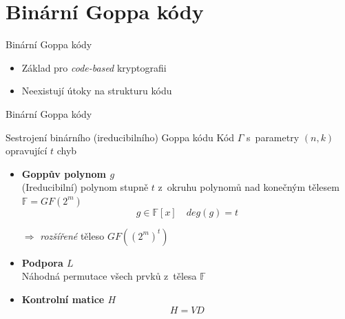 \documentclass{beamer}
\begin{document}
\section{Binární Goppa kódy}

\begin{frame}{Binární Goppa kódy}
    \begin{itemize}

            \pause

        \item Základ pro \emph{code-based} kryptografii

            \pause
        \item Neexistují útoky na strukturu kódu

    \end{itemize}
\end{frame}

\begin{frame}{Binární Goppa kódy}

    \begin{block}{Sestrojení binárního (ireducibilního) Goppa kódu}
        Kód $\Gamma$ s~parametry $(n,k)$ opravující $t$ chyb
        \begin{itemize}

                \pause
            \item \textbf{Goppův polynom $g$} \\
                (Ireducibilní) polynom stupně $t$ z~okruhu polynomů nad
                konečným tělesem $\mathbb F = GF(2^m)$
                $$ g \in \mathbb F [x] \quad deg(g) = t $$

                \pause
                $ \Rightarrow $ \emph{rozšířené} těleso $GF((2^m)^t)$

                \pause
            \item \textbf{Podpora $L$} \\
                Náhodná permutace všech prvků z~tělesa $\mathbb F$

                \pause
            \item \textbf{Kontrolní matice $H$}
                $$ H = V D $$

        \end{itemize}
    \end{block}

\end{frame}
\end{document}
